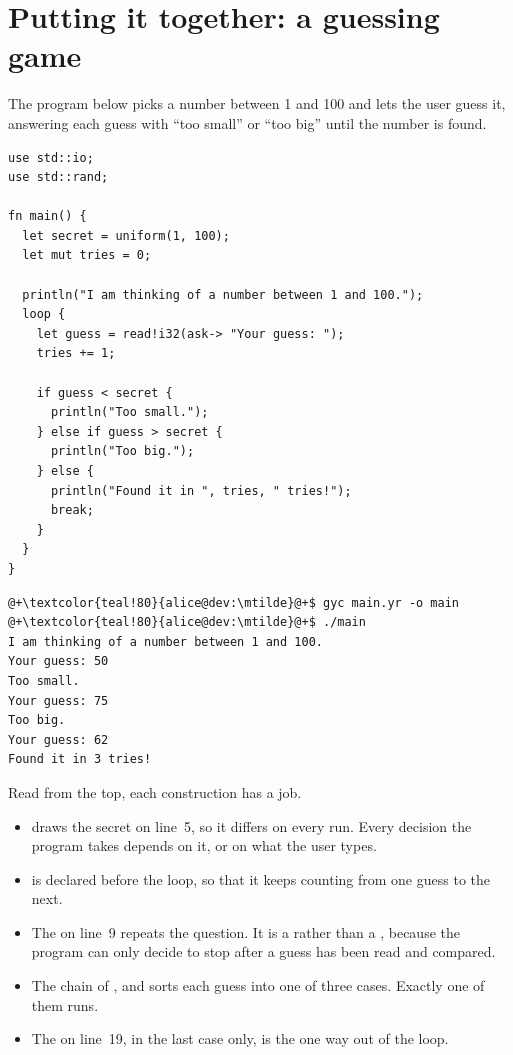\vfill\pagebreak
\section{Putting it together: a guessing game}
\label{sec:control:guessing_game}

The program below picks a number between 1 and 100 and lets the user guess it,
answering each guess with ``too small'' or ``too big'' until the number is
found.

\begin{lstlisting}[style=coloredverbatim, caption=A guessing game, label=lst:control:guessing_game]
use std::io;
use std::rand;

fn main() {
  let secret = uniform(1, 100);
  let mut tries = 0;

  println("I am thinking of a number between 1 and 100.");
  loop {
    let guess = read!i32(ask-> "Your guess: ");
    tries += 1;

    if guess < secret {
      println("Too small.");
    } else if guess > secret {
      println("Too big.");
    } else {
      println("Found it in ", tries, " tries!");
      break;
    }
  }
}
\end{lstlisting}
\vspace{-10pt}%
\begin{lstlisting}[style=bashVerb, escapechar=@+]
@+\textcolor{teal!80}{alice@dev:\mtilde}@+$ gyc main.yr -o main
@+\textcolor{teal!80}{alice@dev:\mtilde}@+$ ./main
I am thinking of a number between 1 and 100.
Your guess: 50
Too small.
Your guess: 75
Too big.
Your guess: 62
Found it in 3 tries!
\end{lstlisting}

Read from the top, each construction has a job.

\begin{itemize}
\item {} draws the secret on line~5, so it differs on every run.
  Every decision the program takes depends on it, or on what the user types.
\item {} is declared before the loop, so that it keeps counting from
  one guess to the next.
\item The  on line~9 repeats the question. It is a 
  rather than a , because the program can only decide to stop after
  a guess has been read and compared.
\item The chain of ,  and  sorts each
  guess into one of three cases. Exactly one of them runs.
\item The  on line~19, in the last case only, is the one way out
  of the loop.
\end{itemize}

